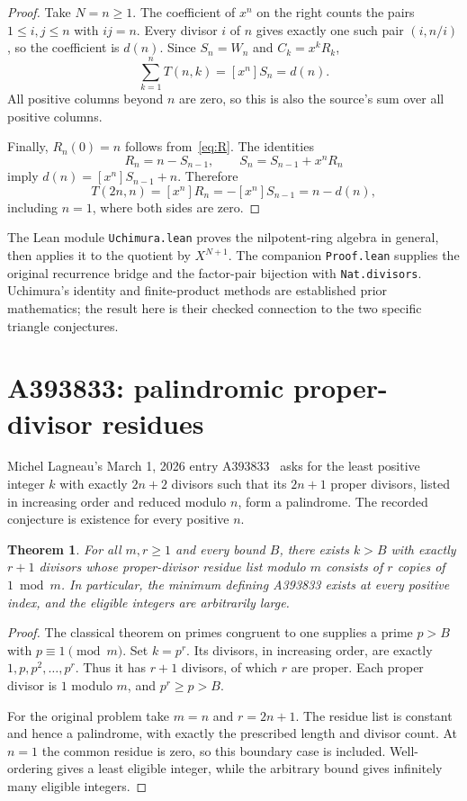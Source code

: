 \documentclass[11pt]{article}
\newtheorem{theorem}{Theorem}[section]
\begin{document}
\begin{proof}
Take $N=n\ge1$. The coefficient of $x^n$ on the right counts the pairs
$1\le i,j\le n$ with $ij=n$. Every divisor $i$ of $n$ gives exactly
one such pair $(i,n/i)$, so the coefficient is $d(n)$. Since $S_n=W_n$
and $C_k=x^kR_k$,
\[
\sum_{k=1}^{n}T(n,k)=[x^n]S_n=d(n).
\]
All positive columns beyond $n$ are zero, so this is also the source's
sum over all positive columns.

Finally, $R_n(0)=n$ follows from~\eqref{eq:R}. The identities
\[
R_n=n-S_{n-1},\qquad S_n=S_{n-1}+x^nR_n
\]
imply $d(n)=[x^n]S_{n-1}+n$. Therefore
\[
T(2n,n)=[x^n]R_n=-[x^n]S_{n-1}=n-d(n),
\]
including $n=1$, where both sides are zero.
\end{proof}

The Lean module \texttt{Uchimura.lean} proves the nilpotent-ring algebra
in general, then applies it to the quotient by $X^{N+1}$.
The companion \texttt{Proof.lean} supplies the original recurrence bridge
and the factor-pair bijection with \texttt{Nat.divisors}.
Uchimura's identity and finite-product methods are established prior
mathematics; the result here is their checked connection to the two
specific triangle conjectures.

\section{A393833: palindromic proper-divisor residues}

Michel Lagneau's March 1, 2026 entry A393833~\cite{A393833} asks for the
least positive integer $k$ with exactly $2n+2$ divisors such that its
$2n+1$ proper divisors, listed in increasing order and reduced modulo
$n$, form a palindrome. The recorded conjecture is existence for every
positive $n$.

\begin{theorem}\label{thm:palindrome}
For all $m,r\ge1$ and every bound $B$, there exists $k>B$ with exactly
$r+1$ divisors whose proper-divisor residue list modulo $m$ consists of
$r$ copies of $1\bmod m$.
In particular, the minimum defining A393833 exists at every positive
index, and the eligible integers are arbitrarily large.
\end{theorem}

\begin{proof}
The classical theorem on primes congruent to one supplies a prime
$p>B$ with $p\equiv1\pmod m$. Set $k=p^r$. Its divisors, in increasing
order, are exactly $1,p,p^2,\ldots,p^r$. Thus it has $r+1$ divisors,
of which $r$ are proper. Each proper divisor is $1$ modulo $m$, and
$p^r\ge p>B$.

For the original problem take $m=n$ and $r=2n+1$. The residue list is
constant and hence a palindrome, with exactly the prescribed length and
divisor count. At $n=1$ the common residue is zero, so this boundary case
is included. Well-ordering gives a least eligible integer, while the
arbitrary bound gives infinitely many eligible integers.
\end{proof}
\end{document}

